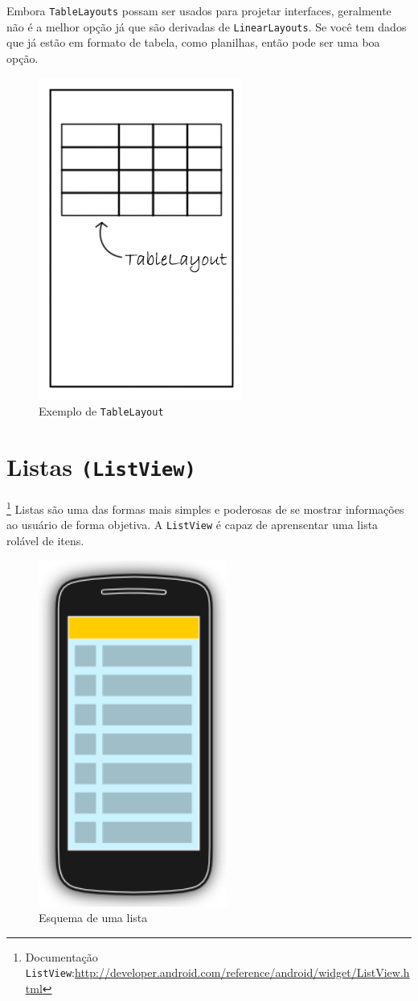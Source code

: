\documentclass[a4paper,12pt,brazil,oneside]{book}
\begin{document}
Embora \texttt{TableLayouts} possam ser usados para projetar interfaces, geralmente não é a melhor opção já que são derivadas de \texttt{LinearLayouts}. Se você tem dados que já estão em formato de tabela, como planilhas, então pode ser uma boa opção.

\begin{figure}[H]
  \centering
  \includegraphics[width=.25\textwidth]{figuras/design/tablelayout.jpg}
  \caption{Exemplo de \texttt{TableLayout}}
  \label{fig:e7}
\end{figure}

\section{Listas \texttt{(ListView)}}\footnote{Documentação \texttt{ListView}:\href{http://developer.android.com/reference/android/widget/ListView.html}{http://developer.android.com/reference/android/widget/ListView.html}}
Listas são uma das formas mais simples e poderosas de se mostrar informações ao usuário de forma objetiva. A \texttt{ListView} é capaz de aprensentar uma lista rolável de itens. 

\begin{figure}[H]
  \centering
  \includegraphics[width=.25\textwidth]{figuras/design/listview-scheme.png}
  \caption{Esquema de uma lista}
  \label{fig:e8}
\end{figure}
\end{document}
